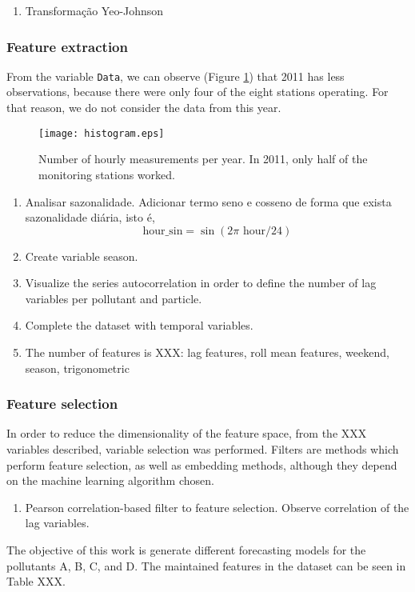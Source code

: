\begin{enumerate}
    \item Transformação Yeo-Johnson 
\end{enumerate}

\subsubsection{Feature extraction}

From the variable {\tt Data}, we can observe (Figure
\ref{fig:histogram-obs-years}) that 2011 has less observations, because there
were only four of the eight stations operating. For that reason, we do not
consider the data from this year. 

\begin{figure}
    \begin{center}
        \texttt{[image: histogram.eps]}
    \end{center}
    \caption{Number of hourly measurements per year. In 2011, only half of the monitoring stations worked.}
    \label{fig:histogram-obs-years}
\end{figure}

\begin{enumerate}
    \item Analisar sazonalidade. Adicionar termo seno e cosseno de forma que
    exista sazonalidade diária, isto é, 
    $$
    \text{hour\_sin} = \sin(2\pi \text{ hour}/24)
    $$
    \item Create variable season. 
    \item Visualize the series autocorrelation in order to define the number
    of lag variables per pollutant and particle.
    \item Complete the dataset with temporal variables.     
    \item The number of features is XXX: lag features, roll mean features,
    weekend, season, trigonometric  
\end{enumerate}

\subsubsection{Feature selection}

In order to reduce the dimensionality of the feature space, from the XXX
variables described, variable selection was performed. Filters are methods
which perform feature selection, as well as embedding methods, although they
depend on the machine learning algorithm chosen. 

\begin{enumerate}
    \item Pearson correlation-based filter to feature selection. Observe
    correlation of the lag variables. 
\end{enumerate}

The objective of this work is generate different forecasting models for the
pollutants A, B, C, and D. The maintained features in the dataset can be seen
in Table XXX.



